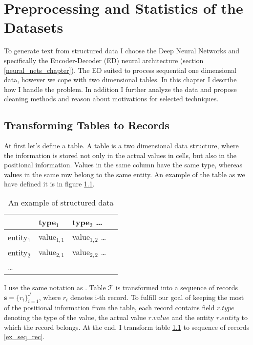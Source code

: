 \chapter{Preprocessing and Statistics of the Datasets} \label{chapPreproc}

To generate text from structured data I choose the Deep Neural Networks and specifically the Encoder-Decoder (ED) neural architecture (section \ref{neural_nets_chapter}). The ED suited to process sequential one dimensional data, however we cope with two dimensional tables. In this chapter I describe how I handle the problem. In addition I further analyze the data and propose cleaning methods and reason about motivations for selected techniques.

\section{Transforming Tables to Records} \label{table_to_record_trans}

At first let's define a table. A table is a two dimensional data structure, where the information is stored not only in the actual values in cells, but also in the positional information. Values in the same column have the same type, whereas values in the same row belong to the same entity. An example of the table as we have defined it is in figure \ref{ex_struct}.

\begin{table}[h]
    \centering
    \begin{tabular}{llll}
        \toprule
        {} & type$_1$ & type$_2$ \dots \\
        \midrule
        entity$_1$ & value$_{1,1}$ &  value$_{1,2}$ \dots \\
        entity$_2$ & value$_{2,1}$ & value$_{2,2}$ \dots \\
        \dots &&
    \end{tabular}
    \caption{An example of structured data} \label{ex_struct}
\end{table}

I use the same notation as \citep{liang-etal-2009-learning}. Table $\mathcal{T}$ is transformed into a sequence of records $ \mathbf{s} = \{ r_i \}_{i=1}^{J} $, where $r_i$ denotes i-th record. To fulfill our goal of keeping the most of the positional information from the table, each record contains field $r.type$ denoting the type of the value, the actual value $r.value$ and the entity $r.entity$ to which the record belongs. At the end, I transform table \ref{ex_struct} to sequence of records \ref{ex_seq_rec}.

